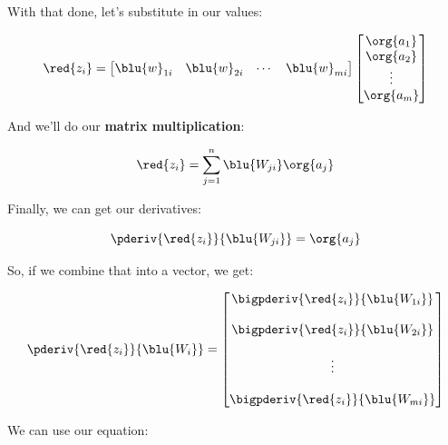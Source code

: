         \subsecdiv
        
        With that done, let's substitute in our values:
        
        \begin{equation}
            \red{z_i} 
            =
            \begin{bmatrix}
                \blu{w}_{1i} & \blu{w}_{2i} & \cdots & \blu{w}_{mi}
            \end{bmatrix}
            \begin{bmatrix}
                \org{a_1}\\\org{a_2}\\ \vdots \\ \org{a_m}
            \end{bmatrix}
        \end{equation}
        
        And we'll do our \textbf{matrix multiplication}:
        
        \begin{equation}
            \red{z_i} 
            =
            \sum_{j=1}^n
            \blu{W_{ji} }\org{a_j}
        \end{equation}
        
        Finally, we can get our derivatives:
        
        \begin{equation}
            \pderiv{ \red{z_i} }{  \blu{W_{ji} }} = \org{a_j}
        \end{equation}
        
        So, if we combine that into a vector, we get:
        
        \begin{equation}
            \pderiv{ \red{z_i} }{  \blu{W_{i} }} =
            \begin{bmatrix}
                \bigpderiv{ \red{z_i} }{  \blu{W_{1i} }}
                \\\\
                \bigpderiv{ \red{z_i} }{  \blu{W_{2i} }}
                \\\\
                \vdots
                \\\\
                \bigpderiv{ \red{z_i} }{  \blu{W_{mi} }}
            \end{bmatrix}
        \end{equation}
        
        We can use our equation:
        
